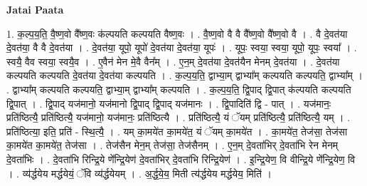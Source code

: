 \documentclass[17pt]{extarticle}
\begin{document}
\textbf{Jatai Paata} \newline

1. क॒ल्प॒य॒ति॒ वै॒ष्ण॒वो वै᳚ष्ण॒वः क॑ल्पयति कल्पयति वैष्ण॒वः । . वै॒ष्ण॒वो वै वै वै᳚ष्ण॒वो वै᳚ष्ण॒वो वै । . वै दे॒वत॑या दे॒वत॑या॒ वै वै दे॒वत॑या । . दे॒वत॑या॒ यूपो॒ यूपो॑ दे॒वत॑या दे॒वत॑या॒ यूपः॑ । . यूपः॒ स्वया॒ स्वया॒ यूपो॒ यूपः॒ स्वया᳚ । . स्वयै॒ वैव स्वया॒ स्वयै॒व । . ए॒वैन॑ मेन मे॒वै वैन᳚म् । . ए॒न॒म् दे॒वत॑या दे॒वत॑यैन मेनम् दे॒वत॑या । . दे॒वत॑या कल्पयति कल्पयति दे॒वत॑या दे॒वत॑या कल्पयति । . क॒ल्प॒य॒ति॒ द्वाभ्या॒म् द्वाभ्या᳚म् कल्पयति कल्पयति॒ द्वाभ्या᳚म् । . द्वाभ्या᳚म् कल्पयति कल्पयति॒ द्वाभ्या॒म् द्वाभ्या᳚म् कल्पयति । . क॒ल्प॒य॒ति॒ द्वि॒पाद् द्वि॒पात् क॑ल्पयति कल्पयति द्वि॒पात् । . द्वि॒पाद् यज॑मानो॒ यज॑मानो द्वि॒पाद् द्वि॒पाद् यज॑मानः । . द्वि॒पादिति॑ द्वि - पात् । . यज॑मानः॒ प्रति॑ष्ठित्यै॒ प्रति॑ष्ठित्यै॒ यज॑मानो॒ यज॑मानः॒ प्रति॑ष्ठित्यै । . प्रति॑ष्ठित्यै॒ यं ॅयम् प्रति॑ष्ठित्यै॒ प्रति॑ष्ठित्यै॒ यम् । . प्रति॑ष्ठित्या॒ इति॒ प्रति॑ - स्थि॒त्यै॒ । . यम् का॒मये॑त का॒मये॑त॒ यं ॅयम् का॒मये॑त । . का॒मये॑त॒ तेज॑सा॒ तेज॑सा का॒मये॑त का॒मये॑त॒ तेज॑सा । . तेज॑सैन मेन॒म् तेज॑सा॒ तेज॑सैनम् । . ए॒न॒म् दे॒वता॑भिर् दे॒वता॑भि रेन मेनम् दे॒वता॑भिः । . दे॒वता॑भि रिन्द्रि॒ये णे᳚न्द्रि॒येण॑ दे॒वता॑भिर् दे॒वता॑भि रिन्द्रि॒येण॑ । . इ॒न्द्रि॒येण॒ वि वीन्द्रि॒ये णे᳚न्द्रि॒येण॒ वि । . व्य॑र्द्धयेय मर्द्धयेयं॒ ॅवि व्य॑र्द्धयेयम् । . अ॒र्द्ध॒ये॒य॒ मिती त्य॑र्द्धयेय मर्द्धयेय॒ मिति॑ । \newline
\end{document}

